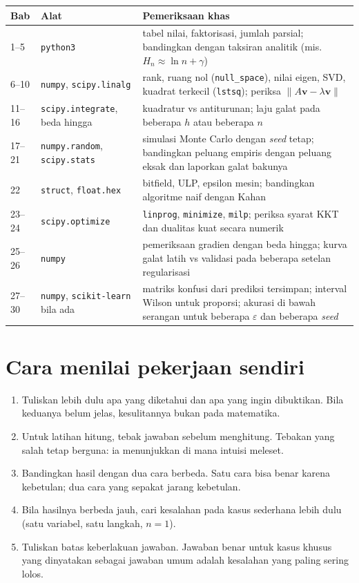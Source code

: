 \documentclass[11pt,a4paper,oneside]{book}
\theoremstyle{definition}
\theoremstyle{plain}
\theoremstyle{remark}
\begin{document}
\begin{center}
\small
\begin{tabular}{@{}llp{7.2cm}@{}}
\toprule
\textbf{Bab} & \textbf{Alat} & \textbf{Pemeriksaan khas} \\
\midrule
1--5 & \texttt{python3} & tabel nilai, faktorisasi, jumlah parsial; bandingkan
  dengan taksiran analitik (mis. $H_n\approx\ln n+\gamma$) \\
6--10 & \texttt{numpy}, \texttt{scipy.linalg} & rank, ruang nol (\texttt{null\_space}),
  nilai eigen, SVD, kuadrat terkecil (\texttt{lstsq}); periksa
  $\|A\mathbf{v}-\lambda\mathbf{v}\|$ \\
11--16 & \texttt{scipy.integrate}, beda hingga & kuadratur vs antiturunan; laju
  galat pada beberapa $h$ atau beberapa $n$ \\
17--21 & \texttt{numpy.random}, \texttt{scipy.stats} & simulasi Monte Carlo dengan
  \emph{seed} tetap; bandingkan peluang empiris dengan peluang eksak dan
  laporkan galat bakunya \\
22 & \texttt{struct}, \texttt{float.hex} & bitfield, ULP, epsilon mesin;
  bandingkan algoritme naif dengan Kahan \\
23--24 & \texttt{scipy.optimize} & \texttt{linprog}, \texttt{minimize},
  \texttt{milp}; periksa syarat KKT dan dualitas kuat secara numerik \\
25--26 & \texttt{numpy} & pemeriksaan gradien dengan beda hingga; kurva galat
  latih vs validasi pada beberapa setelan regularisasi \\
27--30 & \texttt{numpy}, \texttt{scikit-learn} bila ada & matriks konfusi dari
  prediksi tersimpan; interval Wilson untuk proporsi; akurasi di bawah serangan
  untuk beberapa $\varepsilon$ dan beberapa \emph{seed} \\
\bottomrule
\end{tabular}
\end{center}

\section*{Cara menilai pekerjaan sendiri}

\begin{enumerate}
  \item Tuliskan lebih dulu apa yang diketahui dan apa yang ingin dibuktikan.
        Bila keduanya belum jelas, kesulitannya bukan pada matematika.
  \item Untuk latihan hitung, tebak jawaban sebelum menghitung. Tebakan yang salah
        tetap berguna: ia menunjukkan di mana intuisi meleset.
  \item Bandingkan hasil dengan dua cara berbeda. Satu cara bisa benar karena
        kebetulan; dua cara yang sepakat jarang kebetulan.
  \item Bila hasilnya berbeda jauh, cari kesalahan pada kasus sederhana lebih dulu
        (satu variabel, satu langkah, $n=1$).
  \item Tuliskan batas keberlakuan jawaban. Jawaban benar untuk kasus khusus yang
        dinyatakan sebagai jawaban umum adalah kesalahan yang paling sering lolos.
\end{enumerate}
\end{document}
